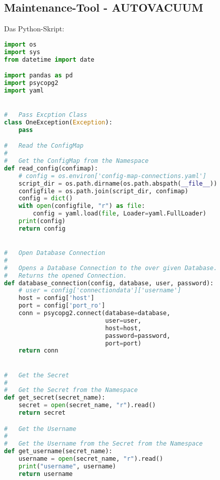 
\begin{flushleft}
    \subsection{Maintenance-Tool - \Gls{AUTOVACUUM}}
    \label{subsec:maintenance_autovacuum}
    Das Python-Skript:
    \lstset{style=gra_codestyle}
    \begin{lstlisting}[language=python, caption=Maintenance-Tool - \Gls{AUTOVACUUM} - ksgr\_postgresql\_maintenance\_autovacuum\_calculation.py,captionpos=b,label={lst:maintenannce-tool-autovacuum-python},breaklines=true]
import os
import sys
from datetime import date

import pandas as pd
import psycopg2
import yaml


#   Pass Excption Class
class OneException(Exception):
    pass

#   Read the ConfigMap
#
#   Get the ConfigMap from the Namespace
def read_config(confimap):
    # config = os.environ['config-map-connections.yaml']
    script_dir = os.path.dirname(os.path.abspath(__file__))
    configfile = os.path.join(script_dir, confimap)
    config = dict()
    with open(configfile, "r") as file:
        config = yaml.load(file, Loader=yaml.FullLoader)
    print(config)
    return config


#   Open Database Connection
#
#   Opens a Database Connection to the over given Database.
#   Returns the opened Connection.
def database_connection(config, database, user, password):
    # user = config['connectiondata']['username']
    host = config['host']
    port = config['port_ro']
    conn = psycopg2.connect(database=database,
                            user=user,
                            host=host,
                            password=password,
                            port=port)
    return conn


#   Get the Secret
#
#   Get the Secret from the Namespace
def get_secret(secret_name):
    secret = open(secret_name, "r").read()
    return secret

#   Get the Username
#
#   Get the Username from the Secret from the Namespace
def get_username(secret_name):
    username = open(secret_name, "r").read()
    print("username", username)
    return username


\end{lstlisting}
\end{flushleft}
